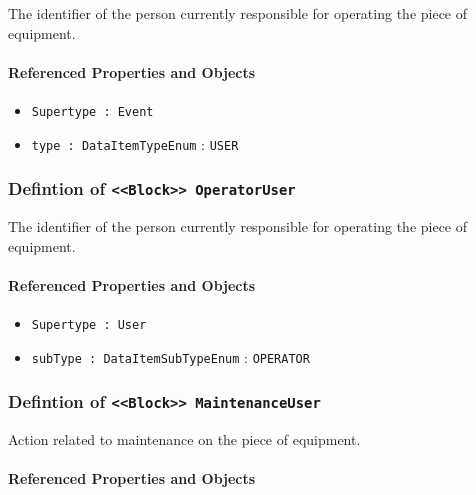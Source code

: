 \FloatBarrier

The identifier of the person currently responsible for operating the piece of equipment.

\FloatBarrier
\paragraph{Referenced Properties and Objects}

\begin{itemize}
\item \texttt{Supertype : Event}

\item \texttt{type : DataItemTypeEnum} : \texttt{USER}

\end{itemize}
\FloatBarrier
\subsubsection{Defintion of \texttt{<<Block>> OperatorUser}}
  \label{type:OperatorUser}

\FloatBarrier

The identifier of the person currently responsible for operating the piece of equipment.

\FloatBarrier
\paragraph{Referenced Properties and Objects}

\begin{itemize}
\item \texttt{Supertype : User}

\item \texttt{subType : DataItemSubTypeEnum} : \texttt{OPERATOR}

\end{itemize}
\FloatBarrier
\subsubsection{Defintion of \texttt{<<Block>> MaintenanceUser}}
  \label{type:MaintenanceUser}

\FloatBarrier

Action related to maintenance on the piece of equipment.

\FloatBarrier
\paragraph{Referenced Properties and Objects}

